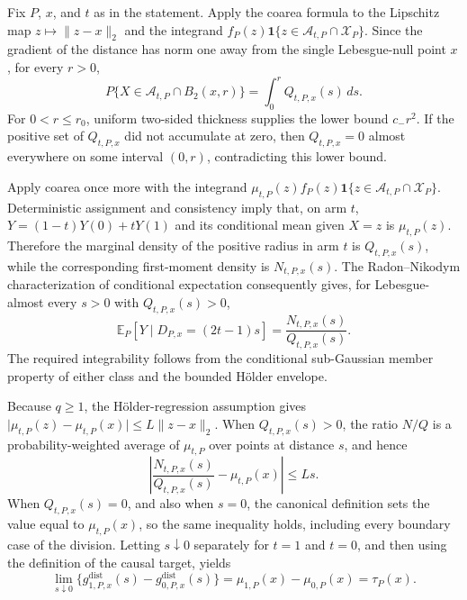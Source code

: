 Fix \(P\), \(x\), and \(t\) as in the statement.  Apply the coarea formula to the Lipschitz map \(z\mapsto\lVert z-x\rVert_2\) and the integrand \(f_P(z)\mathbf 1\{z\in\mathcal A_{t,P}\cap\mathcal X_P\}\).  Since the gradient of the distance has norm one away from the single Lebesgue-null point \(x\), for every \(r>0\),
\[
P\{X\in\mathcal A_{t,P}\cap B_2(x,r)\}
=\int_0^rQ_{t,P,x}(s)\,ds.
\]
For \(0<r\leq r_0\), uniform two-sided thickness supplies the lower bound \(c_{-}r^2\).  If the positive set of \(Q_{t,P,x}\) did not accumulate at zero, then \(Q_{t,P,x}=0\) almost everywhere on some interval \((0,r)\), contradicting this lower bound.

Apply coarea once more with the integrand \(\mu_{t,P}(z)f_P(z)\mathbf 1\{z\in\mathcal A_{t,P}\cap\mathcal X_P\}\).  Deterministic assignment and consistency imply that, on arm \(t\), \(Y=(1-t)Y(0)+tY(1)\) and its conditional mean given \(X=z\) is \(\mu_{t,P}(z)\).  Therefore the marginal density of the positive radius in arm \(t\) is \(Q_{t,P,x}(s)\), while the corresponding first-moment density is \(N_{t,P,x}(s)\).  The Radon--Nikodym characterization of conditional expectation consequently gives, for Lebesgue-almost every \(s>0\) with \(Q_{t,P,x}(s)>0\),
\[
\mathbb E_P[Y\mid D_{P,x}=(2t-1)s]
=\frac{N_{t,P,x}(s)}{Q_{t,P,x}(s)}.
\]
The required integrability follows from the conditional sub-Gaussian member property of either class and the bounded H\"older envelope.

Because \(q\geq1\), the H\"older-regression assumption gives
\(\lvert\mu_{t,P}(z)-\mu_{t,P}(x)\rvert\leq L\lVert z-x\rVert_2\).  When \(Q_{t,P,x}(s)>0\), the ratio \(N/Q\) is a probability-weighted average of \(\mu_{t,P}\) over points at distance \(s\), and hence
\[
\left|\frac{N_{t,P,x}(s)}{Q_{t,P,x}(s)}-\mu_{t,P}(x)\right|\leq Ls.
\]
When \(Q_{t,P,x}(s)=0\), and also when \(s=0\), the canonical definition sets the value equal to \(\mu_{t,P}(x)\), so the same inequality holds, including every boundary case of the division.  Letting \(s\downarrow0\) separately for \(t=1\) and \(t=0\), and then using the definition of the causal target, yields
\[
\lim_{s\downarrow0}\{g^{\mathrm{dist}}_{1,P,x}(s)-g^{\mathrm{dist}}_{0,P,x}(s)\}
=\mu_{1,P}(x)-\mu_{0,P}(x)=\tau_P(x).
\]